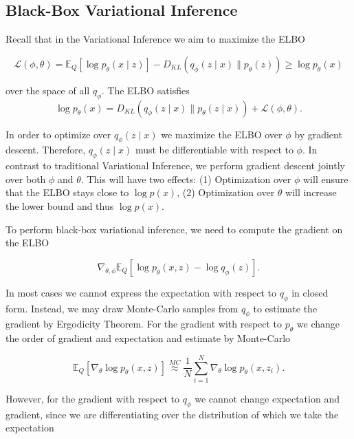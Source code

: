 \documentclass[11pt]{article}
\theoremstyle{plain}
\theoremstyle{definition}
\theoremstyle{plain}
\begin{document}
\subsection{Black-Box Variational Inference}

Recall that in the Variational Inference we aim to maximize the ELBO

\begin{equation}
\mathcal{L}(\phi,\theta)=\mathbb{E}_{Q}\left[\log p_{\theta}(x\mid z)\right]-D_{KL}\left(q_{\phi}(z\mid x)\rVert p_{\theta}(z)\right)\geq\log p_{\theta}(x)
\end{equation}

\noindent over the space of all $q_{\phi}$. The ELBO satisfies
\begin{equation}
\log p_{\theta}(x)=D_{KL}(q_{\phi}(z\mid x)\rVert p_{\theta}(z\mid x))+\mathcal{L}(\phi,\theta).
\end{equation}

\noindent In order to optimize over $q_{\phi}(z\mid x)$ we maximize
the ELBO over $\phi$ by gradient descent. Therefore, $q_{\phi}(z\mid x)$
must be differentiable with respect to $\phi$. In contrast to traditional
Variational Inference, we perform gradient descent jointly over both
$\phi$ and $\theta$. This will have two effects: (1) Optimization
over $\phi$ will ensure that the ELBO stays close to $\log p(x)$,
(2) Optimization over $\theta$ will increase the lower bound and
thus $\log p(x)$.

To perform black-box variational inference, we need to compute the
gradient on the ELBO

\begin{equation}
\nabla_{\theta,\phi}\mathbb{E}_{Q}\left[\log p_{\theta}(x,z)-\log q_{\phi}(z)\right].\label{eq:gradient}
\end{equation}

\noindent In most cases we cannot express the expectation with respect
to $q_{\phi}$ in closed form. Instead, we may draw Monte-Carlo samples
from $q_{\phi}$ to estimate the gradient by Ergodicity Theorem. For
the gradient with respect to $p_{\theta}$ we change the order of
gradient and expectation and estimate by Monte-Carlo

\begin{equation}
\mathbb{E}_{Q}\left[\nabla_{\theta}\log p_{\theta}(x,z)\right]\overset{MC}{\approx}\frac{1}{N}\sum_{i=1}^{N}\nabla_{\theta}\log p_{\theta}(x,z_{i}).
\end{equation}

\noindent However, for the gradient with respect to $q_{\phi}$ we
cannot change expectation and gradient, since we are differentiating
over the distribution of which we take the expectation
\end{document}

